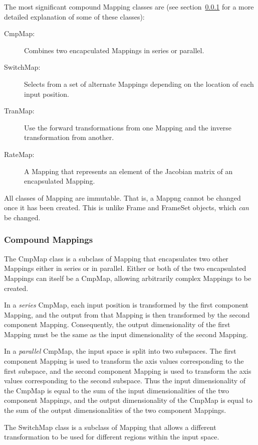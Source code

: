 \documentclass[final,authoryear,5p,times,twocolumn]{elsarticle}
\begin{document}
The most significant compound Mapping classes are (see
section~\ref{sec:cmpmap} for a more detailed explanation of some of these
classes):

\begin{description}
\item[CmpMap:] Combines two encapculated Mappings in series or parallel.
\item[SwitchMap:] Selects from a set of alternate Mappings depending on
the location of each input position.
\item[TranMap:] Use the forward transformations from one Mapping and the
inverse transformation from another.
\item[RateMap:] A Mapping that represents an element of the Jacobian
matrix of an encapsulated Mapping.
\end{description}

All classes of Mapping are immutable. That is, a Mappng cannot be changed
once it has been created. This is unlike Frame and FrameSet objects, which
\emph{can} be changed.

\subsubsection{Compound Mappings}
\label{sec:cmpmap}

The CmpMap class is a subclass of Mapping that encapsulates two other
Mappings either in series or in parallel. Either or both of the two
encapsulated Mappings can itself be a CmpMap, allowing arbitrarily complex
Mappings to be created.

In a \emph{series} CmpMap, each input position is transformed by the
first component Mapping, and the output from that Mapping is then
transformed by the second component Mapping. Consequently, the output
dimensionality of the first Mapping must be the same as the input
dimensionality of the second Mapping.

In a \emph{parallel} CmpMap, the input space is split into two subspaces.
The first component Mapping is used to transform the axis values
corresponding to the first subspace, and the second component Mapping is
used to transform the axis values corresponding to the second subspace.
Thus the input dimensionality of the CmpMap is equal to the sum of the
input dimensionalities of the two component Mappings, and the output
dimensionality of the CmpMap is equal to the sum of the output
dimensionalities of the two component Mappings.

The SwitchMap class is a subclass of Mapping that allows a different
transformation to be used for different regions within the input space.
\end{document}
